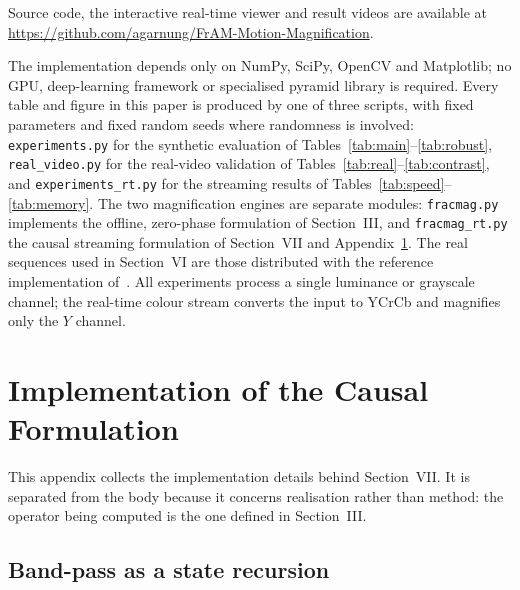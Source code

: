 \documentclass[conference]{IEEEtran}
\newcommand{\repourl}{https://github.com/agarnung/FrAM-Motion-Magnification}
\begin{document}
Source code, the interactive real-time viewer and result videos are available
at \expandafter\url\expandafter{\repourl}.

The implementation depends only on NumPy, SciPy, OpenCV and Matplotlib; no GPU,
deep-learning framework or specialised pyramid library is required. Every table
and figure in this paper is produced by one of three scripts, with fixed
parameters and fixed random seeds where randomness is involved:
\texttt{experiments.py} for the synthetic evaluation of
Tables~\ref{tab:main}--\ref{tab:robust}, \texttt{real\_video.py} for the
real-video validation of Tables~\ref{tab:real}--\ref{tab:contrast}, and
\texttt{experiments\_rt.py} for the streaming results of
Tables~\ref{tab:speed}--\ref{tab:memory}. The two magnification engines are
separate modules: \texttt{fracmag.py} implements the offline, zero-phase
formulation of Section~III, and \texttt{fracmag\_rt.py} the causal streaming
formulation of Section~VII and Appendix~\ref{app:impl}. The real sequences used
in Section~VI are those distributed with the reference implementation
of~\cite{wu2012}. All experiments process a single luminance or grayscale
channel; the real-time colour stream converts the input to YCrCb and magnifies
only the $Y$ channel.

\appendices

\section{Implementation of the Causal Formulation}
\label{app:impl}

This appendix collects the implementation details behind Section~VII. It is
separated from the body because it concerns realisation rather than method: the
operator being computed is the one defined in Section~III.

\subsection{Band-pass as a state recursion}
\end{document}
